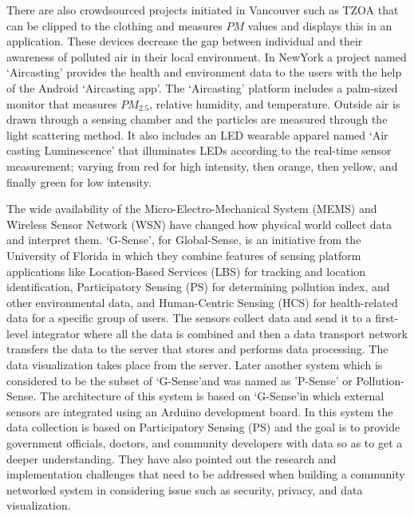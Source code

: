 
There are also crowdsourced projects initiated in Vancouver such as TZOA \cite{tzoa} that can be clipped to the clothing and measures $PM$ values and displays this in an application. These devices decrease the gap between individual and their awareness of polluted air in their local environment. In NewYork a project named \lq{Aircasting}\rq \cite{aircasting} provides the health and environment data to the users with the help of the Android \lq{Aircasting app}\rq. The \lq{Aircasting}\rq\cite{Han2010} platform includes a palm-sized monitor that measures $PM_{2.5}$, relative humidity, and temperature. Outside air is drawn through a sensing chamber and the particles are measured through the light scattering method. It also includes an LED wearable apparel named \lq{Air casting Luminescence}\rq \cite{Luminescence} that illuminates LEDs according to the real-time sensor measurement; varying from red for high intensity, then orange, then yellow, and finally green for low intensity. 

The wide availability of the Micro-Electro-Mechanical System (MEMS) and Wireless Sensor Network (WSN) have changed how physical world collect data and interpret them. \lq{G-Sense}\rq \cite{Perez2010}, for Global-Sense, is an initiative from the University of Florida in which they combine features of sensing platform applications like Location-Based Services (LBS) for tracking and location identification, Participatory Sensing (PS) for determining pollution index, and other environmental data, and Human-Centric Sensing (HCS) for health-related data for a specific group of users. The sensors collect data and send it to a first-level integrator where all the data is combined and then a data transport network transfers the data to the server that stores and performs data processing. The data visualization takes place from the server. Later another system which is considered to be the subset of \lq{G-Sense}\rq and was named as 'P-Sense' \cite{Mendez2011} or Pollution-Sense. The architecture of this system is based on \lq{G-Sense}\rq in which external sensors are integrated using an Arduino development board. In this system the data collection is based on Participatory Sensing (PS) and the goal is to provide government officials, doctors, and community developers with data so as to get a deeper understanding. They have also pointed out the research and implementation challenges that need to be addressed when building a community networked system in considering issue such as security, privacy, and data visualization.

